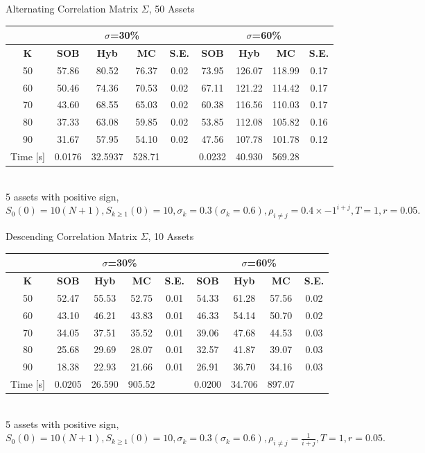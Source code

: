 \documentclass[a4paper]{article}
\begin{document}
\begin {table}
\caption {Alternating Correlation Matrix $\Sigma$, 50 Assets} 
\begin{center}
\begin{tabular}{c|c c c c|c c c c}
\hline
\multicolumn{1}{c|}{} & \multicolumn{4}{|c|}{$\sigma$=30\%} & \multicolumn{4}{|c}{$\sigma$=60\%} \\ 
\hline
  \textbf{K} & \textbf{SOB} & \textbf{Hyb}	& \textbf{MC} & \textbf{S.E.} & \textbf{SOB} & \textbf{Hyb} & \textbf{MC} & \textbf{S.E.}\\
50 &	57.86&80.52 	& 76.37  & 0.02 & 73.95  &126.07 &118.99 &0.17 \\
60 & 	50.46& 74.36& 70.53 & 0.02&67.11 &121.22 & 114.42&0.17 \\
70 & 43.60& 68.55& 65.03& 0.02& 60.38&116.56&110.03&0.17\\
80 & 	37.33& 63.08& 59.85& 0.02&53.85&112.08&105.82&0.16 \\
90 & 31.67& 57.95& 54.10& 0.02&47.56&107.78&101.78&0.12\\
\hline
Time [s] & 0.0176 &32.5937 & 528.71 & &0.0232 &40.930 & 569.28 & \\
\hline
\end{tabular}
\\[8pt]
\caption*{5 assets with positive sign, $S_0(0)=10(N+1), S_{k\geq1}(0) = 10, \sigma_k = 0.3 (\sigma_k = 0.6), \rho_{i\neq j} = 0.4\times-1^{i+j}, T = 1, r=0.05.$}
\end{center}
\end{table}

\begin {table}
\caption {Descending Correlation Matrix $\Sigma$, 10 Assets} 
\begin{center}
\begin{tabular}{c|c c c c|c c c c}
\hline
\multicolumn{1}{c|}{} & \multicolumn{4}{|c|}{$\sigma$=30\%} & \multicolumn{4}{|c}{$\sigma$=60\%} \\ 
\hline
  \textbf{K} & \textbf{SOB} & \textbf{Hyb}	& \textbf{MC} & \textbf{S.E.} & \textbf{SOB} & \textbf{Hyb} & \textbf{MC} & \textbf{S.E.} \\
50 &	52.47	&	55.53	&	52.75	& 0.01	&	54.33	&	61.28	&	57.56 &	0.02 \\
60 & 	43.10	& 	46.21	& 	43.83 	& 0.01  &46.33 & 54.14 & 50.70& 0.02 \\
70 & 34.05 	& 37.51&35.52& 0.01& 39.06&47.68& 44.53 &0.03 \\
80 & 	25.68	&  29.69&28.07&0.01& 32.57& 41.87&39.07&0.03 \\
90 & 18.38 	& 22.93& 21.66 &0.01 & 26.91 &36.70 & 34.16 & 0.03 \\
\hline
Time [s] &0.0205 & 26.590 & 905.52 & &0.0200 &34.706& 897.07 & \\
\hline
\end{tabular}
\\[8pt]
\caption*{5 assets with positive sign, $S_0(0)=10(N+1), S_{k\geq1}(0) = 10, \sigma_k = 0.3 (\sigma_k = 0.6), \rho_{i\neq j} = \frac{1}{i+j}, T = 1, r=0.05.$}
\end{center}
\end{table}
\end{document}
